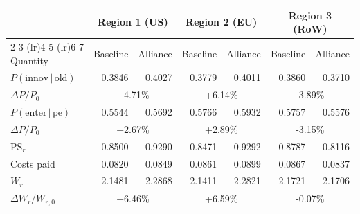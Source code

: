 \begin{tabular}{lrrrrrr}
\toprule
& \multicolumn{2}{c}{Region 1 (US)} & \multicolumn{2}{c}{Region 2 (EU)} & \multicolumn{2}{c}{Region 3 (RoW)} \\
\cmidrule(lr){2-3} \cmidrule(lr){4-5} \cmidrule(lr){6-7}
Quantity & Baseline & Alliance & Baseline & Alliance & Baseline & Alliance \\
\midrule
$P(\text{innov}\,|\,\text{old})$ & 0.3846 & 0.4027 & 0.3779 & 0.4011 & 0.3860 & 0.3710 \\
\quad $\Delta P / P_0$ & \multicolumn{2}{c}{+4.71\%} & \multicolumn{2}{c}{+6.14\%} & \multicolumn{2}{c}{-3.89\%} \\
$P(\text{enter}\,|\,\text{pe})$ & 0.5544 & 0.5692 & 0.5766 & 0.5932 & 0.5757 & 0.5576 \\
\quad $\Delta P / P_0$ & \multicolumn{2}{c}{+2.67\%} & \multicolumn{2}{c}{+2.89\%} & \multicolumn{2}{c}{-3.15\%} \\
$\mathrm{PS}_r$ & 0.8500 & 0.9290 & 0.8471 & 0.9292 & 0.8787 & 0.8116 \\
Costs paid & 0.0820 & 0.0849 & 0.0861 & 0.0899 & 0.0867 & 0.0837 \\
\midrule
$W_r$ & 2.1481 & 2.2868 & 2.1411 & 2.2821 & 2.1721 & 2.1706 \\
\quad $\Delta W_r / W_{r,0}$ & \multicolumn{2}{c}{+6.46\%} & \multicolumn{2}{c}{+6.59\%} & \multicolumn{2}{c}{-0.07\%} \\
\bottomrule
\end{tabular}
